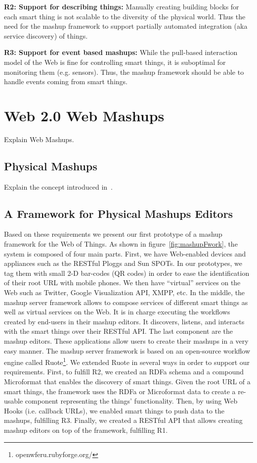\textbf{R2: Support for describing things:} Manually creating building blocks for each smart thing is not scalable to the diversity of the physical world. Thus the need for the mashup framework to support partially automated integration (aka service discovery) of things.

\textbf{R3: Support for event based mashups:} While the pull-based interaction model of the Web is fine for controlling smart things, it is suboptimal for monitoring them (e.g. sensors). Thus, the mashup framework should be able to handle events coming from smart things.


\section{Web 2.0 Web Mashups}
Explain Web Mashups.
    
\subsection{Physical Mashups}
Explain the concept introduced in~\cite{guinard_giving_2010}.


\subsection{A Framework for Physical Mashups Editors}
Based on these requirements we present our first prototype of a mashup framework for the Web of Things. As shown in figure~\ref{fig:mashupFwork}, the system is composed of four main parts. First, we have Web-enabled devices and appliances such as the RESTful Ploggs and Sun SPOTs. In our prototypes, we tag them with small 2-D bar-codes (QR codes) in order to ease the identification of their root URL with mobile phones. We then have ``virtual'' services on the Web such as Twitter, Google Visualization API, XMPP, etc. In the middle, the mashup server framework allows to compose services of different smart things as well as virtual services on the Web. It is in charge executing the workflows created by end-users in their mashup editors. It discovers, listens, and interacts with the smart things over their RESTful API. The last component are the mashup editors. These applications allow users to create their mashups in a very easy manner. 
The mashup server framework is based on an open-source workflow engine called Ruote\footnote{openwferu.rubyforge.org/}. We extended Ruote in several ways in order to support our requirements. First, to fulfill R2, we created an RDFa schema and a compound Microformat that enables the discovery of smart things. Given the root URL of a smart things, the framework uses the RDFa or Microformat data to create a re-usable component representing the things' functionality. Then, by using Web Hooks (i.e. callback URLs), we enabled smart things to push data to the mashups, fulfilling R3. Finally, we created a RESTful API that allows creating mashup editors on top of the framework, fulfilling R1.


